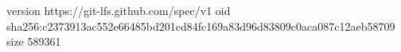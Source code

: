 version https://git-lfs.github.com/spec/v1
oid sha256:c2373913ac552e66485bd201cd84fc169a83d96d83809c0aca087c12aeb58709
size 589361
